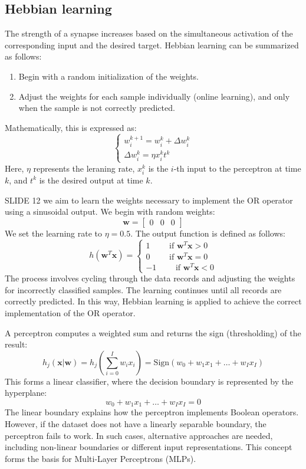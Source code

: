 \subsection{Hebbian learning}
The strength of a synapse increases based on the simultaneous activation of the corresponding input and the desired target. 
Hebbian learning can be summarized as follows:
\begin{enumerate}
    \item Begin with a random initialization of the weights.
    \item Adjust the weights for each sample individually (online learning), and only when the sample is not correctly predicted.
\end{enumerate}
Mathematically, this is expressed as:
\[\begin{cases}
    w_i^{k+1}=w_i^k+\Delta w_i^k \\
    \Delta w_i^k=\eta x_i^kt^k
\end{cases}\]
Here, $\eta$ represents the leraning rate, $x_i^k$ is the $i$-th input to  the perceptron at time $k$, and $t^k$ is the desired output at time $k$.

\begin{example}
    SLIDE 12
    we aim to learn the weights necessary to implement the OR operator using a sinusoidal output. 
    We begin with random weights:
    \[\mathbf{w}=\begin{bmatrix} 0 & 0 & 0 \end{bmatrix}\]
    We set the learning rate to $\eta=0.5$. 
    The output function is defined as follows:
    \[h(\mathbf{w}^T\mathbf{x})=\begin{cases}
        1 \qquad\text{ if }\mathbf{w}^T\mathbf{x} > 0 \\
        0 \qquad\text{ if }\mathbf{w}^T\mathbf{x} = 0 \\
        -1 \qquad\text{ if }\mathbf{w}^T\mathbf{x} < 0
    \end{cases}\]
    The process involves cycling through the data records and adjusting the weights for incorrectly classified samples. 
    The learning continues until all records are correctly predicted. 
    In this way, Hebbian learning is applied to achieve the correct implementation of the OR operator.
\end{example}
A perceptron computes a weighted sum and returns the sign (thresholding) of the result:
\[h_j(\mathbf{x}|\mathbf{w})=h_j\left(\sum_{i=0}^Iw_ix_i\right)=\text{Sign}(w_0+w_1x_1+\dots+w_Ix_I)\]
This forms a linear classifier, where the decision boundary is represented by the hyperplane:
\[w_0+w_1x_1+\dots+w_Ix_I=0\]
The linear boundary explains how the perceptron implements Boolean operators. 
However, if the dataset does not have a linearly separable boundary, the perceptron fails to work. 
In such cases, alternative approaches are needed, including non-linear boundaries or different input representations. 
This concept forms the basis for Multi-Layer Perceptrons (MLPs).
